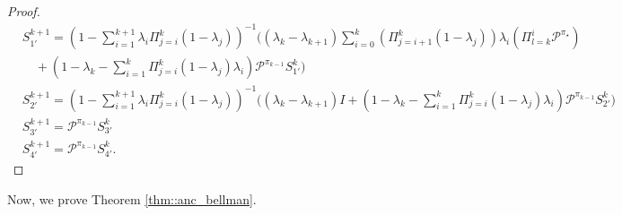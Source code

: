 \documentclass{article} %
\newcommand{\cP}{\mathcal{P}}
\newcommand*{\para}[1]{\left({#1}\right)}
\begin{document}
\begin{proof}
\begin{align*}
    &S^{k+1}_{1'} = \para{1-\sum_{i=1}^{k+1} \lambda_i \Pi^{k}_{j=i} (1-\lambda_j)}^{-1} \bigg((\lambda_{k}-\lambda_{k+1})\sum_{i=0}^{k} (\Pi^k_{j=i+1} (1-\lambda_j)) \lambda_{i}\para{\Pi^{i}_{l=k}\cP^{\pi_{\star}}} 
    \\& \quad +\para{1-\lambda_k-\sum_{i=1}^{k}  \Pi^{k}_{j=i} (1-\lambda_j)\lambda_i}\cP^{\pi_{k-1}}S^k_{1'} \bigg) 
    \\&S^{k+1}_{2'} =\para{1-\sum_{i=1}^{k+1} \lambda_i \Pi^{k}_{j=i} (1-\lambda_j)}^{-1}\bigg((\lambda_{k}-\lambda_{k+1})I+\para{1-\lambda_k-\sum_{i=1}^{k}  \Pi^{k}_{j=i} (1-\lambda_j)\lambda_i}\cP^{\pi_{k-1}}S^{k}_{2'} \bigg)
    \\&S^{k+1}_{3'}=\cP^{\pi_{k-1}}S^{k}_{3'}
    \\&S^{k+1}_{4'}=\cP^{\pi_{k-1}}S^{k}_{4'}.
\end{align*}
\end{proof}
Now, we prove Theorem \ref{thm::anc_bellman}.
\end{document}
